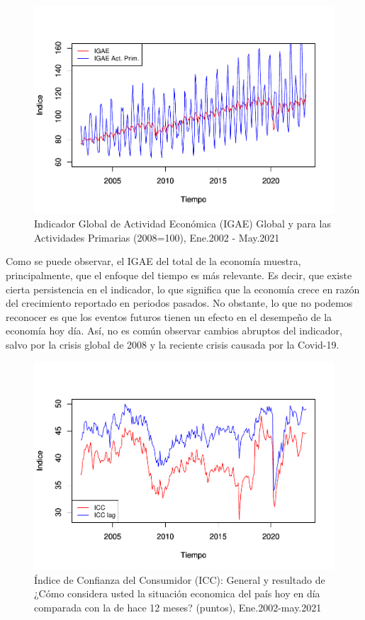 \documentclass[
]{book}
\begin{document}
\begin{figure}

{\centering \includegraphics{bookdown-demo_files/figure-latex/fig1-1} 

}

\caption{Indicador Global de Actividad Económica (IGAE) Global y para las Actividades Primarias (2008=100), Ene.2002 - May.2021}\label{fig:fig1}
\end{figure}

Como se puede observar, el IGAE del total de la economía muestra, principalmente, que el enfoque del tiempo es más relevante. Es decir, que existe cierta persistencia en el indicador, lo que significa que la economía crece en razón del crecimiento reportado en periodos pasados. No obstante, lo que no podemos reconocer es que los eventos futuros tienen un efecto en el desempeño de la economía hoy día. Así, no es común observar cambios abruptos
del indicador, salvo por la crisis global de 2008 y la reciente crisis causada
por la Covid-19.

\begin{figure}

{\centering \includegraphics{bookdown-demo_files/figure-latex/fig2-1} 

}

\caption{Índice de Confianza del Consumidor (ICC): General y resultado de ¿Cómo considera usted la situación economica del país hoy en día comparada con la de hace 12 meses? (puntos), Ene.2002-may.2021}\label{fig:fig2}
\end{figure}
\end{document}
